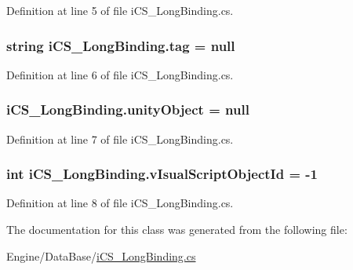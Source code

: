 Definition at line 5 of file i\+C\+S\+\_\+\+Long\+Binding.\+cs.

\hypertarget{classi_c_s___long_binding_abd24c5882b6351410c6d9fe16395a057}{
\subsubsection[{tag}]{\setlength{\rightskip}{0pt plus 5cm}string i\+C\+S\+\_\+\+Long\+Binding.\+tag = null}}\label{classi_c_s___long_binding_abd24c5882b6351410c6d9fe16395a057}


Definition at line 6 of file i\+C\+S\+\_\+\+Long\+Binding.\+cs.

\hypertarget{classi_c_s___long_binding_a91ad4e8b44b4616e60495fccc8ebe48e}{
\subsubsection[{unity\+Object}]{ i\+C\+S\+\_\+\+Long\+Binding.\+unity\+Object = null}}\label{classi_c_s___long_binding_a91ad4e8b44b4616e60495fccc8ebe48e}


Definition at line 7 of file i\+C\+S\+\_\+\+Long\+Binding.\+cs.

\hypertarget{classi_c_s___long_binding_a16c03fb2846640fabbc010300d7bad61}{
\subsubsection[{v\+Isual\+Script\+Object\+Id}]{\setlength{\rightskip}{0pt plus 5cm}int i\+C\+S\+\_\+\+Long\+Binding.\+v\+Isual\+Script\+Object\+Id = -\/1}}\label{classi_c_s___long_binding_a16c03fb2846640fabbc010300d7bad61}


Definition at line 8 of file i\+C\+S\+\_\+\+Long\+Binding.\+cs.



The documentation for this class was generated from the following file\+:\begin{DoxyCompactItemize}
\item 
Engine/\+Data\+Base/\hyperlink{i_c_s___long_binding_8cs}{i\+C\+S\+\_\+\+Long\+Binding.\+cs}\end{DoxyCompactItemize}
